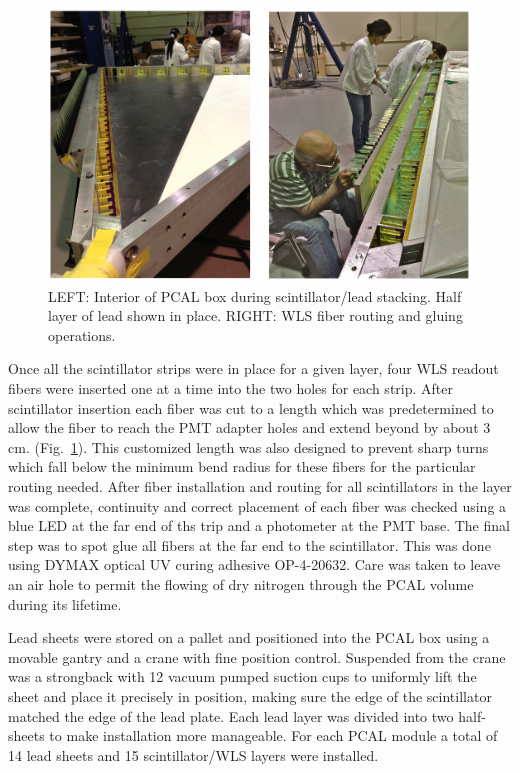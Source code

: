 \begin{figure}[hbt]
\centering
\includegraphics[width=0.95\columnwidth,keepaspectratio]{img/S5_2.png}
\caption{LEFT: Interior of PCAL box during scintillator/lead stacking.  Half layer of lead shown in place. RIGHT: WLS fiber routing and gluing operations.}
\label{fig:S5_2}
\end{figure}

Once all the scintillator strips were in place for a given layer, four WLS readout fibers were inserted one at a time into the two holes for each strip.  After scintillator insertion each fiber was cut to a length which was predetermined to allow the fiber to reach the PMT adapter holes and extend beyond by about 3 cm. (Fig.~\ref{fig:S5_2}).  This customized length was also designed to prevent sharp turns which fall below the minimum bend radius for these fibers for the particular routing needed.  After fiber installation and routing for all scintillators in the layer was complete, continuity and correct placement of each fiber was checked using a blue LED at the far end of ths trip and a photometer at the PMT base.  The final step was to spot glue all fibers at the far end to the scintillator.  This was done using DYMAX optical UV curing adhesive OP-4-20632.  Care was taken to leave an air hole to permit the flowing of dry nitrogen through the PCAL volume during its lifetime. 

Lead sheets were stored on a pallet and positioned into the PCAL box using a movable gantry and a crane with fine position control.  Suspended from the crane was a strongback with 12 vacuum pumped suction cups to uniformly lift the sheet and place it precisely in position, making sure the edge of the scintillator matched the edge of the lead plate.  Each lead layer was divided into two half-sheets to make installation more manageable.  For each PCAL module a total of 14 lead sheets and 15 scintillator/WLS layers were installed.

